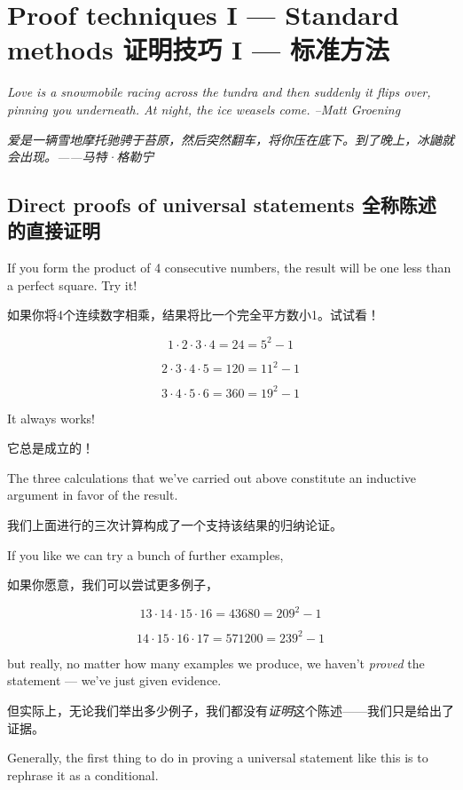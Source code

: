 

\chapter[Proof techniques I]{Proof techniques I --- Standard methods 证明技巧 I --- 标准方法}
\label{ch:proof1}

{\em Love is a snowmobile racing across the tundra and then suddenly it %
      flips over, pinning you underneath. At night, the  %
      ice weasels come. --Matt Groening}

{\em 爱是一辆雪地摩托驰骋于苔原，然后突然翻车，将你压在底下。到了晚上，冰鼬就会出现。——马特·格勒宁}

\section{Direct proofs of universal statements 全称陈述的直接证明}
\label{sec:direct}

If you form the product of 4 consecutive numbers, the result will be one
less than a perfect square. Try it!

如果你将4个连续数字相乘，结果将比一个完全平方数小1。试试看！

\[ 1 \cdot 2 \cdot 3 \cdot 4 = 24 = 5^2 - 1 \]

\[ 2 \cdot 3 \cdot 4 \cdot 5 = 120 = 11^2 - 1 \]

\[ 3 \cdot 4 \cdot 5 \cdot 6 = 360 = 19^2 - 1 \]

It always works!

它总是成立的！

The three calculations that we've carried out above constitute an
inductive argument in favor of the result.

我们上面进行的三次计算构成了一个支持该结果的归纳论证。

If you like we can try
a bunch of further examples,

如果你愿意，我们可以尝试更多例子，

\[ 13 \cdot 14 \cdot 15 \cdot 16 = 43680 = 209^2 - 1 \]

\[ 14 \cdot 15 \cdot 16 \cdot 17 = 571200 = 239^2 - 1 \]

\noindent but really, no matter how many examples we produce, we haven't
{\em proved} the statement --- we've just given evidence.

\noindent 但实际上，无论我们举出多少例子，我们都没有{\em 证明}这个陈述——我们只是给出了证据。

Generally, the first thing to do in proving a universal statement like
this is to rephrase it as a conditional.

